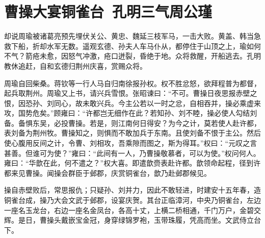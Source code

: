 \chapter{曹操大宴铜雀台~孔明三气周公瑾}

却说周瑜被诸葛亮预先埋伏关公、黄忠、魏延三枝军马，一击大败。黄盖、韩当急救下船，折却水军无数。遥观玄德、孙夫人车马仆从，都停住于山顶之上，瑜如何不气？箭疮未愈，因怒气冲激，疮口迸裂，昏绝于地。众将救醒，开船逃去。孔明教休追赶，自和玄德归荆州庆喜，赏赐众将。

周瑜自回柴桑。蒋钦等一行人马自归南徐报孙权。权不胜忿怒，欲拜程普为都督，起兵取荆州。周瑜又上书，请兴兵雪恨。张昭谏曰：“不可。曹操日夜思报赤壁之恨，因恐孙、刘同心，故未敢兴兵。今主公若以一时之忿，自相吞并，操必乘虚来攻，国势危矣。”顾雍曰：“许都岂无细作在此？若知孙、刘不睦，操必使人勾结刘备。备惧东吴，必投曹操。若是，则江南何日得安？为今之计，莫若使人赴许都，表刘备为荆州牧。曹操知之，则惧而不敢加兵于东南。且使刘备不恨于主公。然后使心腹用反间之计，令曹、刘相攻，吾乘隙而图之，斯为得耳。”权曰：“元叹之言甚善。但谁可为使？”雍曰：“此间有一人，乃曹操敬慕者，可以为使。”权问何人。雍曰：“华歆在此，何不遣之？”权大喜。即遣歆赍表赴许都。歆领命起程，径到许都来见曹操。闻操会群臣于邺郡，庆赏铜雀台，歆乃赴邺郡候见。

操自赤壁败后，常思报仇；只疑孙、刘并力，因此不敢轻进，时建安十五年春，造铜雀台成，操乃大会文武于邺郡，设宴庆贺。其台正临漳河，中央乃铜雀台，左边一座名玉龙台，右边一座名金凤台，各高十丈，上横二桥相通，千门万户，金碧交辉。是日，曹操头戴嵌宝金冠，身穿绿锦罗袍，玉带珠履，凭高而坐。文武侍立台下。

